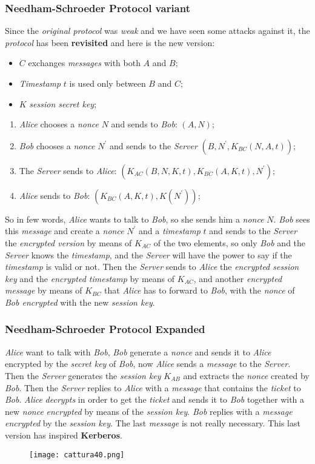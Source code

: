 \documentclass{article}
\begin{document}
\subsubsection{Needham-Schroeder Protocol variant}
Since the \emph{original protocol} was \emph{weak} and we have seen some attacks against it, the \emph{protocol} has been \textbf{revisited} and here is the new version:
\begin{itemize}
\item $C$ exchanges \emph{messages} with both $A$ and $B$;
\item \emph{Timestamp} $t$ is used only between $B$ and $C$;
\item $K$ \emph{session secret key};
\end{itemize}
\begin{enumerate}
\item \emph{Alice} chooses a \emph{nonce} $N$ and sends to \emph{Bob}: $(A,N)$;
\item \emph{Bob} chooses a \emph{nonce} $N^{'}$ and sends to the \emph{Server} $(B,N^{'}, K_{BC}(N,A,t))$;
\item The \emph{Server} sends to \emph{Alice}: $(K_{AC}(B,N,K,t), K_{BC}(A,K,t), N^{'})$;
\item \emph{Alice} sends to \emph{Bob}: $(K_{BC}(A,K,t), K(N^{'}))$;
\end{enumerate}
So in few words, \emph{Alice} wants to talk to \emph{Bob}, so she sends him a \emph{nonce} $N$. \emph{Bob} sees this \emph{message} and create a \emph{nonce} $N^{'}$ and a \emph{timestamp} $t$ and sends to the \emph{Server} the \emph{encrypted version} by means of $K_{AC}$ of the two elements, so only \emph{Bob} and the \emph{Server} knows the \emph{timestamp}, and the \emph{Server} will have the power to say if the \emph{timestamp} is valid or not. Then the \emph{Server} sends to \emph{Alice} the \emph{encrypted session key} and the \emph{encrypted timestamp} by means of $K_{AC}$, and another \emph{encrypted message} by means of $K_{BC}$ that \emph{Alice} has to forward to \emph{Bob}, with the \emph{nonce} of \emph{Bob encrypted} with the new \emph{session key}. 
\subsubsection{Needham-Schroeder Protocol Expanded}
\emph{Alice} want to talk with \emph{Bob}, \emph{Bob} generate a \emph{nonce} and sends it to \emph{Alice} encrypted by the \emph{secret key} of \emph{Bob}, now \emph{Alice} sends a \emph{message} to the \emph{Server}. Then the \emph{Server} generates the \emph{session key} $K_{AB}$ and extracts the \emph{nonce} created by \emph{Bob}. Then the \emph{Server} replies to \emph{Alice} with a \emph{message} that contains the \emph{ticket} to \emph{Bob}. \emph{Alice} \emph{decrypts} in order to get the \emph{ticket} and sends it to \emph{Bob} together with a new \emph{nonce} \emph{encrypted} by means of the \emph{session key}. \emph{Bob} replies with a \emph{message encrypted} by the \emph{session key}. The last \emph{message} is not really necessary. This last version has inspired \textbf{Kerberos}. 
\begin{figure}[H]
  \centering
  \texttt{[image: cattura40.png]}
\end{figure}
\end{document}
